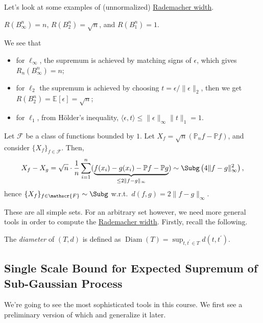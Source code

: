 Let's look at some examples of (unnormalized) \hyperref[def:Rademacher-width]{Rademacher width}.

\begin{eg}
	\(R(B_\infty ^n) = n\), \(R(B_2^n)= \sqrt{n} \), and \(R(B_1^n) = 1\).
\end{eg}
\begin{explanation}
	We see that
	\begin{itemize}
		\item for \(\ell _\infty \), the supremum is achieved by matching signs of \(\epsilon \), which gives \(R_n(B_\infty ^n) = n\);
		\item for \(\ell _2\) the supremum is achieved by choosing \(t = \epsilon / \lVert \epsilon \rVert _2\), then we get \(R(B_2^n) = \mathbb{E}_{}\left[\epsilon \right] = \sqrt{n} \);
		\item for \(\ell _1\), from Hölder's inequality, \(\langle \epsilon , t \rangle \leq \lVert \epsilon \rVert _\infty \lVert t \rVert _1 = 1\).
	\end{itemize}
\end{explanation}

\begin{eg}\label{eg:supremum-of-empirical-process}
	Let \(\mathscr{F} \) be a class of functions bounded by \(1\). Let \(X_f = \sqrt{n} (\mathbb{P} _n f - \mathbb{P} f)\), and consider \(\{ X_f \}_{f\in \mathscr{F} } \). Then,
	\[
		X_f - X_g
		= \sqrt{n} \cdot \frac{1}{n}\sum_{i=1}^{n} ( \underbrace{f(x_i) - g(x_i) - \mathbb{P} f - \mathbb{P} g }_{\leq 2 \lVert f-g \rVert _\infty })
		\sim \Subg\left( 4 \lVert f - g \rVert _\infty ^2 \right) ,
	\]
	hence \(\{ X_f \} _{f\in \mathscr{F} } \sim \Subg\) w.r.t.\ \(d(f, g) = 2\lVert f - g \rVert _\infty\).
\end{eg}

These are all simple sets. For an arbitrary set however, we need more general tools in order to compute the \hyperref[def:Rademacher-width]{Rademacher width}. Firstly, recall the following.

\begin{definition}[Diameter]\label{def:diameter}
	The \emph{diameter} of \((T, d)\) is defined as \(\mathop{\mathrm{Diam}}(T) = \sup _{t, t^{\prime} \in T} d(t, t^{\prime} )\).
\end{definition}

\subsection{Single Scale Bound for Expected Supremum of Sub-Gaussian Process}
We're going to see the most sophisticated tools in this course. We first see a preliminary version of which and generalize it later.

